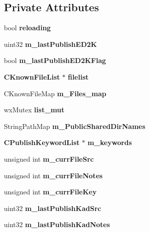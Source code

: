 \subsection*{Private Attributes}
\begin{DoxyCompactItemize}
\item 
bool {\bfseries reloading}\label{classCSharedFileList_ae49bc47d0e25abc29091ae41df3aba48}

\item 
uint32 {\bfseries m\_\-lastPublishED2K}\label{classCSharedFileList_a1d6105f09f18e939f29589603c6edc09}

\item 
bool {\bfseries m\_\-lastPublishED2KFlag}\label{classCSharedFileList_a210f6506e5606d2bfe02ce531a8b34cc}

\item 
{\bf CKnownFileList} $\ast$ {\bfseries filelist}\label{classCSharedFileList_addd565a1770c3c2d78bd00b8bb124bfb}

\item 
CKnownFileMap {\bfseries m\_\-Files\_\-map}\label{classCSharedFileList_af9567341bcebcaca773878516ada9075}

\item 
wxMutex {\bfseries list\_\-mut}\label{classCSharedFileList_a3618d4b6d6cb1e54b0f601a7f69f0dc6}

\item 
StringPathMap {\bfseries m\_\-PublicSharedDirNames}\label{classCSharedFileList_a554023d8228200cadff079ead269e759}

\item 
{\bf CPublishKeywordList} $\ast$ {\bf m\_\-keywords}\label{classCSharedFileList_ab7439fa9e98529e9d1229b609d1115f3}

\item 
unsigned int {\bfseries m\_\-currFileSrc}\label{classCSharedFileList_aff6a3dfac02bd99070e3189922b2ef03}

\item 
unsigned int {\bfseries m\_\-currFileNotes}\label{classCSharedFileList_a5196ff8057e96bbfc4f51e63f635929c}

\item 
unsigned int {\bfseries m\_\-currFileKey}\label{classCSharedFileList_a695bb2e67ae704aaf15fcee6b2b2aa65}

\item 
uint32 {\bfseries m\_\-lastPublishKadSrc}\label{classCSharedFileList_ac2611cca64fd481a39d3b6bab41a7654}

\item 
uint32 {\bfseries m\_\-lastPublishKadNotes}\label{classCSharedFileList_a05a0b06986b0d74de63f0d9f134da231}

\end{DoxyCompactItemize}


